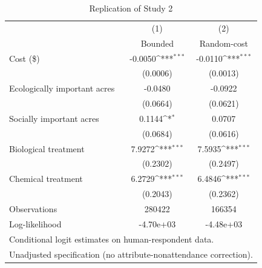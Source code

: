 {
\begin{table}[]
\centering
\caption{Replication of Study 2}
\def\sym#1{\ifmmode^{#1}\else\(^{#1}\)\fi}
\begin{tabular}{l*{2}{c}}
\toprule
                    &\multicolumn{1}{c}{(1)}&\multicolumn{1}{c}{(2)}\\
                    &\multicolumn{1}{c}{Bounded}&\multicolumn{1}{c}{Random-cost}\\
\midrule
Cost (\$)            &     -0.0050\sym{***}&     -0.0110\sym{***}\\
                    &    (0.0006)         &    (0.0013)         \\
\addlinespace
Ecologically important acres&     -0.0480         &     -0.0922         \\
                    &    (0.0664)         &    (0.0621)         \\
\addlinespace
Socially important acres&      0.1144\sym{*}  &      0.0707         \\
                    &    (0.0684)         &    (0.0616)         \\
\addlinespace
Biological treatment&      7.9272\sym{***}&      7.5935\sym{***}\\
                    &    (0.2302)         &    (0.2497)         \\
\addlinespace
Chemical treatment  &      6.2729\sym{***}&      6.4846\sym{***}\\
                    &    (0.2043)         &    (0.2362)         \\
\midrule
Observations        &      280422         &      166354         \\
Log-likelihood      &   -4.70e+03         &   -4.48e+03         \\
\bottomrule
\multicolumn{3}{l}{\footnotesize Conditional logit estimates on \textcite{Giguere2020} human-respondent data.}\\
\multicolumn{3}{l}{\footnotesize Unadjusted specification (no attribute-nonattendance correction).}\\
\end{tabular}
\end{table}
}
